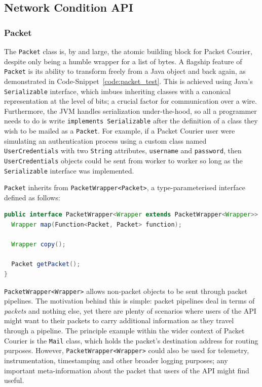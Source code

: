 \newpage

\subsection{Network Condition API}

\subsubsection{Packet}

The \texttt{Packet} class is, by and large, the atomic building block for Packet Courier, despite only being a humble
wrapper for a list of bytes. A flagship feature of \texttt{Packet} is its ability to transform freely from a Java
object and back again, as demonstrated in Code-Snippet~\ref{code:packet_test}. This is achieved using Java's
\texttt{Serializable} interface\cite{java_Serializable}, which imbues inheriting classes with a canonical
representation at the level of bits; a crucial factor for communication over a wire. Furthermore, the JVM handles
serialization under-the-hood, so all a programmer needs to do is write \texttt{implements Serializable} after the
definition of a class they wish to be mailed as a \texttt{Packet}. For example, if a Packet Courier user were
simulating an authentication process using a custom class named \texttt{UserCredentials} with two \texttt{String}
attributes, \texttt{username} and \texttt{password}, then \texttt{UserCredentials} objects could be sent from worker
to worker so long as the \texttt{Serializable} interface was implemented.

\texttt{Packet} inherits from \texttt{PacketWrapper<Packet>}, a type-parameterised interface defined as follows:

\begin{lstlisting}[language=Java,caption={The \texttt{PacketWrapper<Wrapper>} interface exactly as it appears in the
codebase.},label={code:packet_wrapper_interface},captionpos=b]
public interface PacketWrapper<Wrapper extends PacketWrapper<Wrapper>> {
  Wrapper map(Function<Packet, Packet> function);

  Wrapper copy();

  Packet getPacket();
}
\end{lstlisting}


\texttt{PacketWrapper<Wrapper>} allows non-packet objects to be sent through packet pipelines. The motivation behind
this is simple: packet pipelines deal in terms of \emph{packets} and nothing else, yet there are plenty of scenarios
where users of the API might want to their packets to carry additional information as they travel through a pipeline.
The principle example within the wider context of Packet Courier is the \texttt{Mail} class, which holds the packet's
destination address for routing purposes. However, \texttt{PacketWrapper<Wrapper>} could also be used for telemetry,
instrumentation, timestamping and other broader logging purposes; any important meta-information about the packet
that users of the API might find useful.


